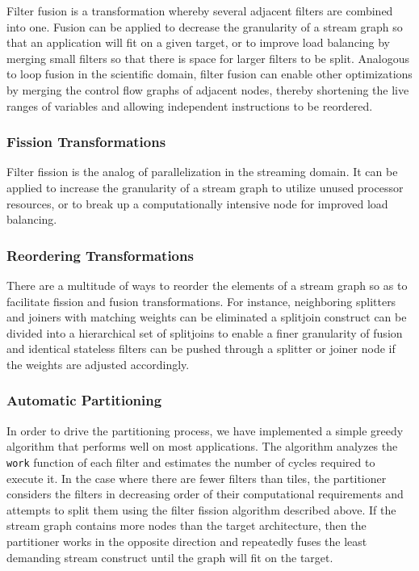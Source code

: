 Filter fusion is a transformation whereby several adjacent filters are
combined into one.  Fusion can be applied to decrease the granularity
of a stream graph so that an application will fit on a given target,
or to improve load balancing by merging small filters so that there is
space for larger filters to be split.  Analogous to loop fusion in the
scientific domain, filter fusion can enable other optimizations by
merging the control flow graphs of adjacent nodes, thereby shortening
the live ranges of variables and allowing independent instructions to
be reordered.



\subsubsection{Fission Transformations}

Filter fission is the analog of parallelization in the streaming
domain.  It can be applied to increase the granularity of a stream
graph to utilize unused processor resources, or to break up a
computationally intensive node for improved load balancing.


\subsubsection{Reordering Transformations}

There are a multitude of ways to reorder the elements of a stream
graph so as to facilitate fission and fusion transformations.  For
instance, neighboring splitters and joiners with matching weights can
be eliminated a splitjoin construct can be divided into a hierarchical
set of splitjoins to enable a finer granularity of fusion and
identical stateless filters can be pushed through a splitter or joiner
node if the weights are adjusted accordingly.

\subsubsection{Automatic Partitioning}

In order to drive the partitioning process, we have implemented a
simple greedy algorithm that performs well on most applications.  The
algorithm analyzes the {\tt work} function of each filter and
estimates the number of cycles required to execute it.  
In the case where there are fewer filters than tiles, the partitioner
considers the filters in decreasing order of their computational
requirements and attempts to split them using the filter fission
algorithm described above.  
If the stream graph contains more nodes than the target architecture,
then the partitioner works in the opposite direction and repeatedly
fuses the least demanding stream construct until the graph will fit on
the target.  

